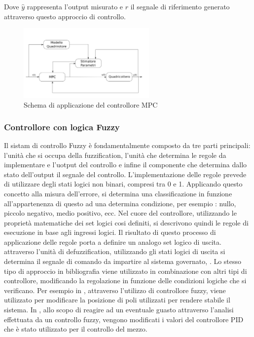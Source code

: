 Dove $\hat{y}$ rappresenta l'output misurato e $r$ il segnale di riferimento generato attraverso questo approccio di controllo.

\begin{figure}
	\centering
	\includegraphics[width=0.6\textwidth]{SistemaQuadrirotore/Figure/MPC}
	\caption{Schema di applicazione del controllore MPC}
\end{figure}

\subsubsection{Controllore con logica Fuzzy}

Il sistam di controllo Fuzzy è fondamentalmente composto da tre parti principali: l'unità che si occupa della fuzzification, l'unità che determina le regole da implementare e l'uotput del controllo e infine il componente che determina dallo stato dell'output il segnale del controllo. 
L'implementazione delle regole prevede di utilizzare degli stati logici non binari, compresi tra 0 e 1. Applicando questo concetto alla misura dell'errore, si determina una classificazione in funzione all'appartenenza di questo ad una determina condizione, per esempio : nullo, piccolo negativo, medio positivo, ecc. Nel cuore del controllore, utilizzando le proprietà matematiche dei set logici cosi definiti, si descrivono quindi le regole di esecuzione in base agli ingressi logici. Il risultato di questo processo di applicazione delle regole porta a definire un analogo set logico di uscita. attraverso l'unità di defuzzification, utilizzando gli stati logici di uscita si determina il segnale di comando da impartire al sistema governato, \cite{ChenGuanrong2001ItFS}.
Lo stesso tipo di approccio in bibliografia viene utilizzato in combinazione con altri tipi di controllore, modificando la regolazione in funzione delle condizioni logiche che si verificano.
Per esempio in \cite{6988024}, attraverso l'utilizzo di controllore fuzzy, viene utilizzato per modificare la posizione di poli utilizzati per rendere stabile il sistema. In \cite{AmoozgarMohammadHadi2012FFGP}, allo scopo di reagire ad un eventuale guasto attraverso l'analisi effettuata da un controllo fuzzy, vengono modificati i valori del controllore PID che è stato utilizzato per il controllo del mezzo.


